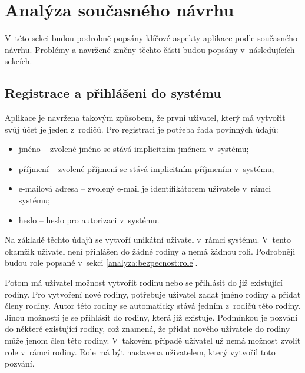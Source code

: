 \section{Analýza současného návrhu} \label{analyza:analyza navrhu}
    V~této sekci budou podrobně popsány klíčové aspekty aplikace podle současného návrhu. Problémy a navržené změny těchto části budou popsány v~následujících sekcích.

    \subsection{Registrace a přihlášeni do systému}
        Aplikace je navržena takovým způsobem, že první uživatel, který má vytvořit svůj účet je jeden z~rodičů. Pro registraci je potřeba řada povinných údajů:
        \begin{itemize}
        \setlength\itemsep{0.3em}
	        \item jméno -- zvolené jméno se stává implicitním jménem v~systému;
	        \item příjmení -- zvolené příjmení se stává implicitním příjmením v~systému;
	        \item e-mailová adresa -- zvolený e-mail je identifikátorem uživatele v~rámci systému;
	        \item heslo -- heslo pro autorizaci v~systému.
        \end{itemize}
        Na základě těchto údajů se vytvoří unikátní uživatel v~rámci systému. V~tento okamžik uživatel není přihlášen do žádné rodiny a nemá žádnou roli. Podrobněji budou role popsané v~sekci \ref{analyza:bezpecnost:role}.
        
        Potom má uživatel možnost vytvořit rodinu nebo se přihlásit do již existující rodiny. Pro vytvoření nové rodiny, potřebuje uživatel zadat jméno rodiny a přidat členy rodiny. Autor této rodiny se automaticky stává jedním z~rodičů této rodiny. Jinou možností je se přihlásit do rodiny, která již existuje. Podmínkou je pozvání do některé existující rodiny, což znamená, že přidat nového uživatele do rodiny může jenom člen této rodiny. V~takovém případě uživatel už nemá možnost zvolit role v~rámci rodiny. Role má být nastavena uživatelem, který vytvořil toto pozvání.

